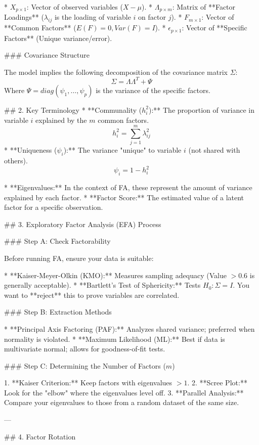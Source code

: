 * $X_{p \times 1}$: Vector of observed variables ($X - \mu$).
* $\Lambda_{p \times m}$: Matrix of **Factor Loadings** ($\lambda_{ij}$ is the loading of variable $i$ on factor $j$).
* $F_{m \times 1}$: Vector of **Common Factors** ($E(F)=0, Var(F)=I$).
* $\epsilon_{p \times 1}$: Vector of **Specific Factors** (Unique variance/error).

### Covariance Structure

The model implies the following decomposition of the covariance matrix $\Sigma$:
$$\Sigma = \Lambda \Lambda^T + \Psi$$
Where $\Psi = diag(\psi_1, \dots, \psi_p)$ is the variance of the specific factors.

## 2. Key Terminology
* **Communality ($h_i^2$):** The proportion of variance in variable $i$ explained by the $m$ common factors.
$$h_i^2 = \sum_{j=1}^m \lambda_{ij}^2$$
* **Uniqueness ($\psi_i$):** The variance "unique" to variable $i$ (not shared with others).
$$\psi_i = 1 - h_i^2$$

* **Eigenvalues:** In the context of FA, these represent the amount of variance explained by each factor.
* **Factor Score:** The estimated value of a latent factor for a specific observation.

## 3. Exploratory Factor Analysis (EFA) Process

### Step A: Check Factorability

Before running FA, ensure your data is suitable:

* **Kaiser-Meyer-Olkin (KMO):** Measures sampling adequacy (Value $> 0.6$ is generally acceptable).
* **Bartlett’s Test of Sphericity:** Tests $H_0: \Sigma = I$. You want to **reject** this to prove variables are correlated.

### Step B: Extraction Methods

* **Principal Axis Factoring (PAF):** Analyzes shared variance; preferred when normality is violated.
* **Maximum Likelihood (ML):** Best if data is multivariate normal; allows for goodness-of-fit tests.

### Step C: Determining the Number of Factors ($m$)

1. **Kaiser Criterion:** Keep factors with eigenvalues $> 1$.
2. **Scree Plot:** Look for the "elbow" where the eigenvalues level off.
3. **Parallel Analysis:** Compare your eigenvalues to those from a random dataset of the same size.

---

## 4. Factor Rotation

